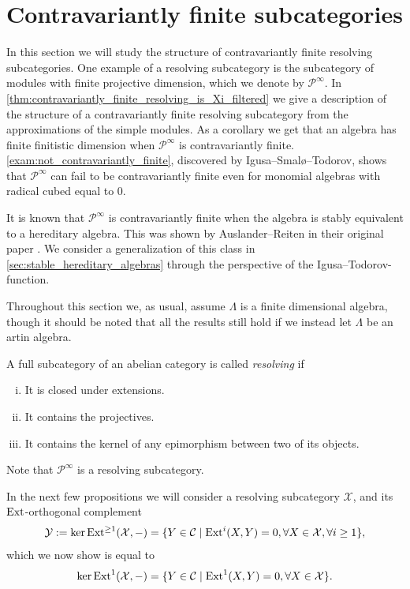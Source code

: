\section{Contravariantly finite subcategories}\label{sec:contravariantly_finite}


In this section we will study the structure of contravariantly finite resolving subcategories. One example of a resolving subcategory is the subcategory of modules with finite projective dimension, which we denote by $\mathcal P^\infty$. In \cref{thm:contravariantly_finite_resolving_is_Xi_filtered} we give a description of the structure of a contravariantly finite resolving subcategory from the approximations of the simple modules. As a corollary we get that an algebra has finite finitistic dimension when $\mathcal P^\infty$ is contravariantly finite. \cref{exam:not_contravariantly_finite}, discovered by Igusa--Smalø--Todorov, shows that $\mathcal P^\infty$ can fail to be contravariantly finite even for monomial algebras with radical cubed equal to 0.

It is known that $\mathcal P^\infty$ is contravariantly finite when the algebra is stably equivalent to a hereditary algebra. This was shown by Auslander--Reiten in their original paper \cite{AR91}. We consider a generalization of this class in \cref{sec:stable_hereditary_algebras} through the perspective of the Igusa--Todorov-function.

Throughout this section we, as usual, assume $\Lambda$ is a finite dimensional algebra, though it should be noted that all the results still hold if we instead let $\Lambda$ be an artin algebra.

\begin{defn}[Resolving]
	A full subcategory of an abelian category is called \emph{resolving} if 
	\begin{enumerate}[i)]
		\item It is closed under extensions.
		\item It contains the projectives.
		\item It contains the kernel of any epimorphism between two of its objects.
	\end{enumerate}
\end{defn}

Note that $\mathcal P^\infty$ is a resolving subcategory.

In the next few propositions we will consider a resolving subcategory $\mathcal X$, and its $\operatorname{Ext}$-orthogonal complement
\begin{align*}
	\mathcal Y := \ker \operatorname{Ext}^{\geq 1}(\mathcal X, -) = \{Y \in \mathcal C \mid \operatorname{Ext}^i(X, Y)=0, \forall X \in \mathcal X, \forall i \geq 1\},
\end{align*}
which we now show is equal to 
\begin{align*}
\ker \operatorname{Ext}^1(\mathcal X, -) = \{Y \in \mathcal C \mid \operatorname{Ext}^1(X, Y)=0, \forall X \in \mathcal X\}.
\end{align*}

